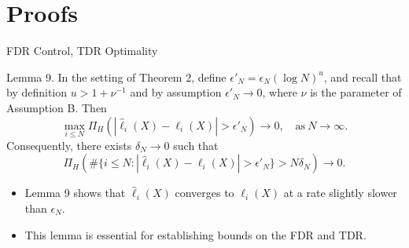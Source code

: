 \documentclass[10pt, aspectratio=169]{beamer}
\begin{document}
\section{Proofs}
\begin{frame}{FDR Control, TDR Optimality}

    \begin{mytheorembox}{Lemma 9.}
        In the setting of Theorem 2, define \(\epsilon'_N = \epsilon_N (\log N)^u\), and recall that by definition \(u > 1 + \nu^{-1}\) and by assumption \(\epsilon'_N \to 0\), where \(\nu\) is the parameter of Assumption B. Then
        \[
        \max_{i \leq N} \Pi_H(|\hat{\ell}_i(X) - \ell_i(X)| > \epsilon'_N) \to 0, \quad \text{as} \ N \to \infty. \tag{20}
        \] 
        Consequently, there exists \(\delta_N \to 0\) such that
        \[
        \Pi_H\left(\#\{i \leq N : |\hat{\ell}_i(X) - \ell_i(X)| > \epsilon'_N\} > N \delta_N \right) \to 0.
        \]
    \end{mytheorembox}
    \begin{itemize}[label=\scalebox{0.5}{$\blacksquare$}]
        \item Lemma 9 shows that \(\hat{\ell}_i(X)\) converges to \(\ell_i(X)\) at a rate slightly slower than \(\epsilon_N\).
        \item This lemma is essential for establishing bounds on the FDR and TDR.
    \end{itemize}
\end{frame}
\end{document}
